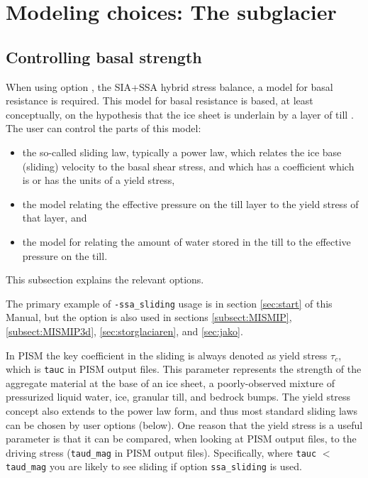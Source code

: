 \section{Modeling choices:  The subglacier}
\label{sec:modeling-subglacier}

\subsection{Controlling basal strength}  \label{subsect:basestrength}

When using option , the SIA+SSA hybrid stress balance, a model for basal resistance is required.  This model for basal resistance is based, at least conceptually, on the hypothesis that the ice sheet is underlain by a layer of till \cite{Clarke05}.  The user can control the parts of this model:\begin{itemize}
\item the so-called sliding law, typically a power law, which relates the ice base (sliding) velocity to the basal shear stress, and which has a coefficient which is or has the units of a yield stress,
\item the model relating the effective pressure on the till layer to the yield stress of that layer, and
\item the model for relating the amount of water stored in the till to the effective pressure on the till.
\end{itemize}
This subsection explains the relevant options.

The primary example of \texttt{-ssa_sliding} usage is in section \ref{sec:start} of this Manual, but the option is also used in sections \ref{subsect:MISMIP}, \ref{subsect:MISMIP3d}, \ref{sec:storglaciaren}, and \ref{sec:jako}.

In PISM the key coefficient in the sliding is always denoted as yield stress $\tau_c$, which is \texttt{tauc} in PISM output files.  This parameter represents the strength of the aggregate material at the base of an ice sheet, a poorly-observed mixture of pressurized liquid water, ice, granular till, and bedrock bumps.  The yield stress concept also extends to the power law form, and thus most standard sliding laws can be chosen by user options (below).  One reason that the yield stress is a useful parameter is that it can be compared, when looking at PISM output files, to the driving stress (\texttt{taud_mag} in PISM output files).  Specifically, where \texttt{tauc} $<$ \texttt{taud_mag} you are likely to see sliding if option \texttt{ssa_sliding} is used.

